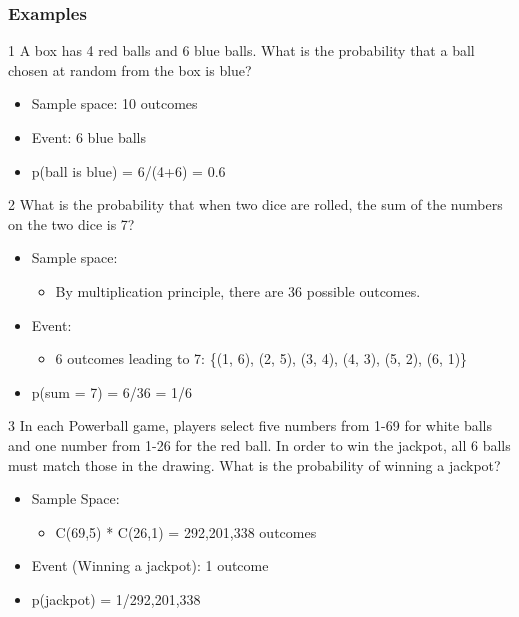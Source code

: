 \documentclass[12pt, letterpaper]{article}
\newcommand{\exheader}[1][ex]{{\tiny{#1}\normalsize}}
\begin{document}
\subsubsection*{Examples}

\exheader[1] A box has 4 red balls and 6 blue balls. What is the probability that a ball chosen at random from the box is blue?
\begin{itemize}[leftmargin=*,  label={}]
	\item Sample space: 10 outcomes 
	\item Event: 6 blue balls 
	\item p(ball is blue) = 6/(4+6) = 0.6
\end{itemize}

\bigbreak
\bigbreak

\exheader[2] What is the probability that when two dice are rolled, the sum of the numbers on the two dice is 7?
\begin{itemize}[leftmargin=*,  label={}]
	\item Sample space:
	\begin{itemize}
		\item By multiplication principle, there are 36 possible outcomes.
	\end{itemize}
	\item Event: 
	\begin{itemize}
		\item 6 outcomes leading to 7: \{(1, 6), (2, 5), (3, 4), (4, 3), (5, 2), (6, 1)\}
	\end{itemize}
	\item p(sum = 7) = 6/36 = 1/6
\end{itemize}

\bigbreak
\bigbreak

\exheader[3] In each Powerball game, players select five numbers from 1-69 for white balls and one number from 1-26 for the red ball. In order to win the jackpot, all 6 balls must match those in the drawing. What is the probability of winning a jackpot?
\begin{itemize}[leftmargin=*,  label={}]
	\item Sample Space:
	\begin{itemize}
		\item C(69,5) * C(26,1) = 292,201,338 outcomes
	\end{itemize}
	\item Event (Winning a jackpot): 1 outcome
	\item p(jackpot) = 1/292,201,338
\end{itemize}
\end{document}

